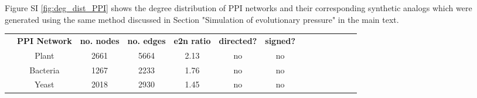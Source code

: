     Figure SI \ref{fig:deg_dist_PPI} shows the degree distribution of PPI networks and their corresponding synthetic analogs which were generated using the same method discussed in Section "Simulation of evolutionary pressure" in the main text.
    \newpage
    \begin{table}[H]%
        \centering
		\setlength\arrayrulewidth{.1pt}%
		\scriptsize %
			\setlength\cellspacetoplimit{\myPadTop} %
			\setlength\cellspacebottomlimit{\myPadBottom} %
			\begin{tabular}{@{}Sc Sc|Sc|Sc|Sc|Sc|Sc@{}}  %
					& \textbf{\normalsize PPI Network} & \textbf{\normalsize no. nodes } & \textbf{\normalsize no. edges }	& \textbf{\normalsize e2n ratio } & \textbf{\normalsize directed? } & \textbf{\normalsize signed? }
                        \\[.05cm] 
                            & Plant  \cite{consortium_evidence_2011}  &  2661  &  5664  &  2.13  & no & no %
        				\\[.05cm] \cline{2-7}
        					& Bacteria  \cite{rajagopala_binary_2014} &  1267  &  2233   &  1.76  & no & no %
        				\\[.05cm] 
        					& Yeast  \cite{yu_high-quality_2008}      &  2018  &  2930   &  1.45  & no & no %
        				\\[.05cm] 

\end{tabular}
\end{table}
